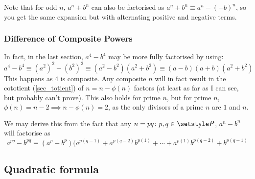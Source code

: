 Note that for odd \(n\), \(a^n + b^n\) can also be factorised as
\(a^n + b^n \equiv a^n - (-b)^n\), so you get the same expansion but with
alternating positive and negative terms.


\subsubsection{Difference of Composite Powers}

In fact, in the last section, \(a^4 - b^4\) may be more fully factorised by
using:
\begin{equation*}
 a^4 - b^4 \equiv (a^2)^2 - (b^2)^2 \equiv (a^2 - b^2)(a^2 + b^2) \equiv
     (a - b)(a + b)(a^2 + b^2)
\end{equation*}
This happens as \(4\) is composite. Any composite \(n\) will in fact result
in the cototient (\ref{sec_totient}) of \(n = n - \phi(n)\) factors (at
least as far as I can see, but probably can't prove). This
also holds for prime \(n\), but for prime \(n\),
\(\phi(n) = n - 2 \implies n - \phi(n) = 2\), as the only divisors of
a prime \(n\) are \(1\) and \(n\).

We may derive this from the fact that any
\(n = pq \colon p, q \in \setstyle P\),
\(a^n - b^n\) will factorise as
\begin{equation*}
 a^{pq} - b^{pq} \equiv
     (a^p - b^p)(a^{p(q - 1)} + a^{p(q - 2)}b^{p(1)} + \dotsb +
                 a^{p(1)}b^{p(q - 2)} + b^{p(q - 1)}
\end{equation*}

\subsection{Quadratic formula} \label{sec_quad_formula}

